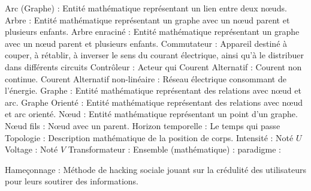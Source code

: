 Arc (Graphe) : Entité mathématique représentant un lien entre deux nœuds.
Arbre : Entité mathématique représentant un graphe avec un nœud parent et plusieurs enfants.
Arbre enraciné : Entité mathématique représentant un graphe avec un nœud parent et plusieurs enfants.
Commutateur : Appareil destiné à couper, à rétablir, à inverser le sens du courant électrique, ainsi qu'à le distribuer dans différents circuits
Contrôleur : Acteur qui
Courent Alternatif : Courent non continue.
Courent Alternatif non-linéaire : Réseau électrique consommant de l'énergie.
Graphe : Entité mathématique représentant des relations avec nœud et arc.
Graphe Orienté : Entité mathématique représentant des relations avec nœud et arc orienté.
Nœud : Entité mathématique représentant un point d'un graphe.
Nœud fils : Nœud avec un parent.
Horizon temporelle : Le temps qui passe
Topologie : Description mathématique de la position de corps.
Intensité : Noté $U$
Voltage : Noté $V$
Transformateur :
Ensemble (mathématique) :
paradigme :

Hameçonnage : Méthode de hacking sociale jouant sur la crédulité des utilisateurs pour leurs soutirer des informations.